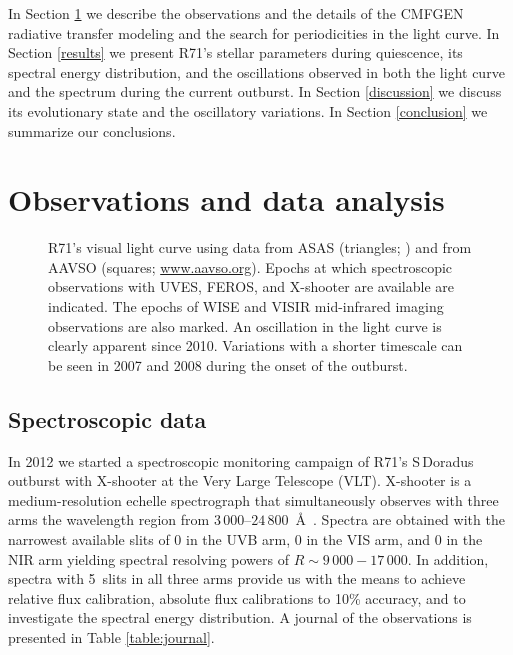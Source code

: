 \documentclass[structabstract]{aa}
\begin{document}
In Section \ref{obs} we describe the observations and the details of the CMFGEN radiative transfer modeling and the search for periodicities in the light curve. In Section \ref{results} we present R71's stellar parameters during quiescence, its spectral energy distribution, and the oscillations observed in both the light curve and the spectrum during the current outburst. In Section \ref{discussion} we discuss its evolutionary state and the oscillatory variations. In Section \ref{conclusion} we summarize our conclusions.


\section{Observations and data analysis}
\label{obs}

 \begin{figure*}
\centering
{}
     \caption{R71's visual light curve using data from ASAS (triangles; \citealt{1997AcA....47..467P}) and from AAVSO (squares; \protect\url{www.aavso.org}). Epochs at which spectroscopic observations with UVES, FEROS, and X-shooter are available are indicated. The epochs of WISE and VISIR mid-infrared imaging observations are also marked. An oscillation in the light curve is clearly apparent since 2010. Variations with a shorter timescale can be seen in 2007 and 2008 during the onset of the outburst.}
     \label{figure:lightcurve}
\end{figure*}


\subsection{Spectroscopic data}
\label{obs:spec}

In 2012 we started a spectroscopic monitoring campaign of R71's S\,Doradus outburst with X-shooter at the Very Large Telescope (VLT). X-shooter is a medium-resolution echelle spectrograph that simultaneously observes with three arms the wavelength region from $3\,000$--$24\,800$~\AA\ \citep{2011A&A...536A.105V}. 
Spectra are obtained with the narrowest available slits of 0 in the UVB arm, 0 in the VIS arm, and 0 in the NIR arm yielding spectral resolving powers of $R\sim9\,000-17\,000$. In addition, spectra with 5\arcsec\ slits in all three arms provide us with the means to achieve relative flux calibration, absolute flux calibrations to 10\% accuracy, and to investigate the spectral energy distribution. A journal of the observations is presented in Table \ref{table:journal}.
\end{document}
